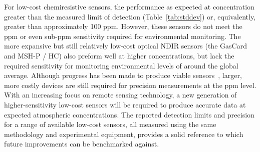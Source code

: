 \documentclass[sensors,article,submit,moreauthors,pdftex]{Definitions/mdpi}
\begin{document}
		For low-cost chemiresistive  sensors, the performance as expected at concentration greater than the measured limit of detection (Table~\ref{tab:stddev}) or, equivalently, greater than approximately 100 ppm.
		However, these sensors do not meet the ppm or even sub-ppm sensitivity required for environmental monitoring.
		The more expansive but still relatively low-cost optical NDIR  sensors (the GasCard  and  MSH-P / HC) also preform well at higher concentrations, but lack the required sensitivity for monitoring environmental levels of  around the global average.
		Although progress has been made to produce viable sensors~\cite{zhu_one_2012}, larger, more costly devices are still required for precision measurements at the ppm level.
		With an increasing focus on remote sensing technology, a new generation of higher-sensitivity low-cost  sensors will be required to produce accurate data at expected atmospheric concentrations.
		The reported detection limits and precision for a range of available low-cost sensors, all measured using the same methodology and experimental equipment, provides a solid reference to which future improvements can be benchmarked against.
		
	
	
	
	
\end{document}
